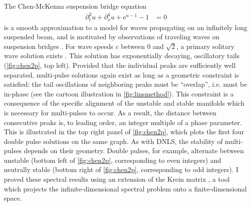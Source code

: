 \documentclass[12pt,reqno,oneside]{article}
\begin{document}
The Chen-McKenna suspension bridge equation 
\begin{align*}
    \partial_t^2 u + \partial_x^4 u + \mathrm{e}^{u-1} - 1 &= 0 
\end{align*}
is a smooth approximation to a model for waves propagating on an infinitely long suspended beam, and is motivated by observations of traveling waves on suspension bridges \cite{McKenna1990,Chen1997}. For wave speeds $c$ between 0 and $\sqrt{2}$, a primary solitary wave solution exists \cite{Berg2018}. This solution has exponentially decaying, oscillatory tails (\cref{fig:chen2p}, top left). Provided that the individual peaks are sufficiently well separated, multi-pulse solutions again exist as long as a geometric constraint is satisfied: the tail oscillations of neighboring peaks must be ``overlap'', i.e. must be in-phase (see the cartoon illustration in \cref{fig:linsmethod}). This constraint is a consequence of the specific alignment of the unstable and stable manifolds which is necessary for multi-pulses to occur. As a result, the distance between consecutive peaks is, to leading order, an integer multiple of a phase parameter. This is illustrated in the top right panel of \cref{fig:chen2p}, which plots the first four double pulse solutions on the same graph. As with DNLS, the stability of multi-pulses depends on their geometry. Double pulses, for example, alternate between unstable (bottom left of \cref{fig:chen2p}, corresponding to even integers) and neutrally stable (bottom right of \cref{fig:chen2p}, corresponding to odd integers). I proved these spectral results using an extension of the Krein matrix \cite{Kapitula2020}, a tool which projects the infinite-dimensional spectral problem onto a finite-dimensional space. 
\end{document}
